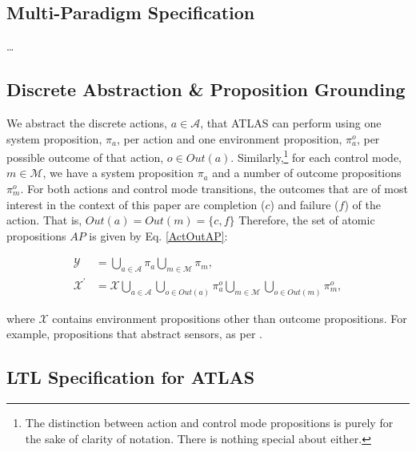 
\subsection{Multi-Paradigm Specification}

\ldots

\subsection{Discrete Abstraction \& Proposition Grounding}


We abstract the discrete actions, $a \in \mathcal{A}$, that ATLAS can perform using one system proposition, $\pi_a$, per action and one environment proposition, $\pi_a^o$, per possible outcome of that action, $o \in Out(a)$.
Similarly,\footnote{The distinction between action and control mode propositions is purely for the sake of clarity of notation. There is nothing special about either.}
for each control mode, $m \in \mathcal{M}$, we have a system proposition $\pi_a$ and a number of outcome propositions $\pi_m^o$.
For both actions and control mode transitions, the outcomes that are of most interest in the context of this paper are completion ($c$) and failure ($f$) of the action. That is, $Out(a) = Out(m) = \{ c, f \}$
Therefore, the set of atomic propositions $AP$ is given by Eq. \eqref{ActOutAP}:

\begin{subequations}
	\label{ActOutAP}
	\begin{align}
		\mathcal{Y} &= \bigcup \limits_{a \in \mathcal{A}} \pi_a \bigcup \limits_{m \in \mathcal{M}} \pi_m,\\
		\mathcal{X}^\prime &= \mathcal{X} \bigcup \limits_{a \in \mathcal{A}} \bigcup \limits_{o \in Out(a)} \pi_a^o \bigcup \limits_{m \in \mathcal{M}} \bigcup \limits_{o \in Out(m)} \pi_m^o,
	\end{align}
\end{subequations}

where $\mathcal{X}$ contains environment propositions other than outcome propositions. For example, propositions that abstract sensors, as per \cite{KGFP_TRO09}.

\subsection{LTL Specification for ATLAS}

